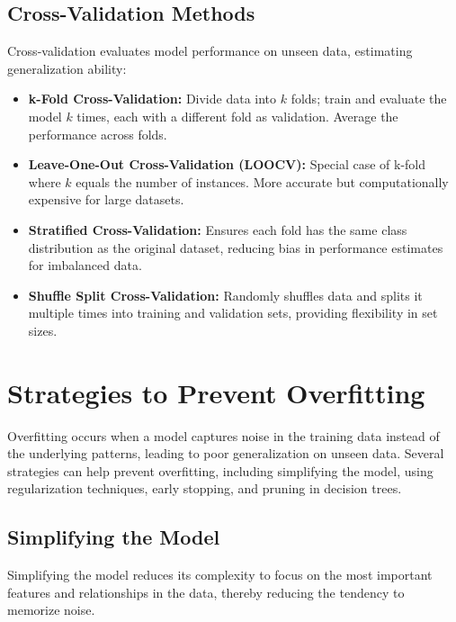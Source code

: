 \documentclass[12pt]{book} %
\begin{document}
\subsection{Cross-Validation Methods}

Cross-validation evaluates model performance on unseen data, estimating generalization ability:

\begin{itemize}
    \item \textbf{k-Fold Cross-Validation:} Divide data into \(k\) folds; train and evaluate the model \(k\) times, each with a different fold as validation. Average the performance across folds.
    
    \item \textbf{Leave-One-Out Cross-Validation (LOOCV):} Special case of k-fold where \(k\) equals the number of instances. More accurate but computationally expensive for large datasets.
    
    \item \textbf{Stratified Cross-Validation:} Ensures each fold has the same class distribution as the original dataset, reducing bias in performance estimates for imbalanced data.
    
    \item \textbf{Shuffle Split Cross-Validation:} Randomly shuffles data and splits it multiple times into training and validation sets, providing flexibility in set sizes.
\end{itemize}

\section{Strategies to Prevent Overfitting}

Overfitting occurs when a model captures noise in the training data instead of the underlying patterns, leading to poor generalization on unseen data. Several strategies can help prevent overfitting, including simplifying the model, using regularization techniques, early stopping, and pruning in decision trees.

\subsection{Simplifying the Model}

Simplifying the model reduces its complexity to focus on the most important features and relationships in the data, thereby reducing the tendency to memorize noise.
\end{document}
